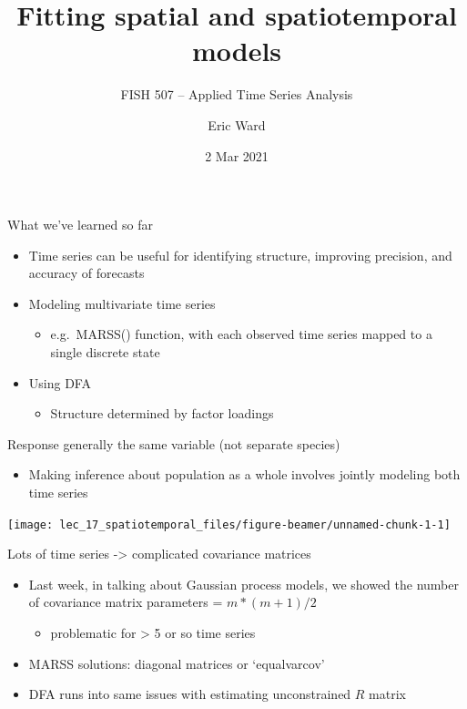 \documentclass[
  ignorenonframetext,
]{beamer}
\title{Fitting spatial and spatiotemporal models}
\subtitle{FISH 507 -- Applied Time Series Analysis}
\author{Eric Ward}
\date{2 Mar 2021}
\providecommand{\tightlist}{%
  \setlength{\itemsep}{0pt}\setlength{\parskip}{0pt}}
\begin{document}
\frame{\titlepage}

\begin{frame}{What we've learned so far}
\protect\hypertarget{what-weve-learned-so-far}{}

\begin{itemize}
\item
  Time series can be useful for identifying structure, improving
  precision, and accuracy of forecasts
\item
  Modeling multivariate time series

  \begin{itemize}
  \tightlist
  \item
    e.g.~MARSS() function, with each observed time series mapped to a
    single discrete state
  \end{itemize}
\item
  Using DFA

  \begin{itemize}
  \tightlist
  \item
    Structure determined by factor loadings
  \end{itemize}
\end{itemize}

\end{frame}

\begin{frame}{Response generally the same variable (not separate
species)}
\protect\hypertarget{response-generally-the-same-variable-not-separate-species}{}

\begin{itemize}
\tightlist
\item
  Making inference about population as a whole involves jointly modeling
  both time series
\end{itemize}

\begin{center}\texttt{[image: lec\_17\_spatiotemporal\_files/figure-beamer/unnamed-chunk-1-1]} \end{center}

\end{frame}

\begin{frame}{Lots of time series -\textgreater{} complicated covariance
matrices}
\protect\hypertarget{lots-of-time-series---complicated-covariance-matrices}{}

\begin{itemize}
\item
  Last week, in talking about Gaussian process models, we showed the
  number of covariance matrix parameters = \(m*(m+1)/2\)

  \begin{itemize}
  \tightlist
  \item
    problematic for \textgreater{} 5 or so time series
  \end{itemize}
\item
  MARSS solutions: diagonal matrices or `equalvarcov'
\item
  DFA runs into same issues with estimating unconstrained \(R\) matrix
\end{itemize}

\end{frame}
\end{document}
